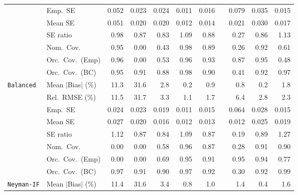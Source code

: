 \begin{landscape}
\begin{longtable}{llrrrrrrrrr}
 & Emp.\ SE & 0.052 & 0.023 & 0.024 & 0.011 & 0.016 &  & 0.079 & 0.035 & 0.015 \\
 & Mean SE & 0.051 & 0.020 & 0.020 & 0.012 & 0.014 &  & 0.021 & 0.030 & 0.017 \\
 & SE ratio & \cellcolor{rankone}0.98 & 0.87 & 0.83 & \cellcolor{ranktwo}1.09 & \cellcolor{rankthree}0.88 &  & 0.27 & 0.86 & 1.13 \\
 & Nom.\ Cov. & \cellcolor{rankone}0.95 & 0.00 & 0.43 & \cellcolor{ranktwo}0.98 & \cellcolor{rankthree}0.89 &  & 0.26 & \cellcolor{ranktwo}0.92 & 0.61 \\
 & Orc.\ Cov.\ (Emp) & \cellcolor{ranktwo}0.96 & 0.00 & 0.53 & \cellcolor{ranktwo}0.96 & \cellcolor{rankthree}0.93 &  & 0.87 & \cellcolor{rankone}0.95 & 0.48 \\
 & Orc.\ Cov.\ (BC) & \cellcolor{rankone}0.95 & 0.91 & 0.88 & \cellcolor{rankthree}0.98 & 0.90 &  & 0.41 & \cellcolor{rankthree}0.92 & \cellcolor{ranktwo}0.97 \\
\addlinespace[2pt]
\quad \texttt{Balanced} & Mean $|$Bias$|$ (\%) & 11.3 & 31.6 & 2.8 & \cellcolor{rankone}0.2 & \cellcolor{rankthree}0.9 &  & \cellcolor{ranktwo}0.8 & \cellcolor{rankone}0.2 & 1.8 \\
 & Rel.\ RMSE (\%) & 11.5 & 31.7 & 3.3 & \cellcolor{rankone}1.1 & \cellcolor{ranktwo}1.7 &  & 6.4 & 2.8 & \cellcolor{rankthree}2.3 \\
 & Emp.\ SE & 0.024 & 0.023 & 0.019 & 0.011 & 0.015 &  & 0.064 & 0.028 & 0.015 \\
 & Mean SE & 0.027 & 0.020 & 0.016 & 0.012 & 0.013 &  & 0.012 & 0.025 & 0.019 \\
 & SE ratio & \cellcolor{rankthree}1.12 & 0.87 & 0.84 & \cellcolor{rankone}1.09 & 0.87 &  & 0.19 & \cellcolor{ranktwo}0.89 & 1.27 \\
 & Nom.\ Cov. & 0.00 & 0.00 & 0.58 & \cellcolor{rankone}0.96 & 0.87 &  & 0.28 & \cellcolor{ranktwo}0.91 & \cellcolor{rankthree}0.90 \\
 & Orc.\ Cov.\ (Emp) & 0.00 & 0.00 & 0.69 & \cellcolor{rankone}0.95 & \cellcolor{rankthree}0.91 &  & \cellcolor{rankone}0.95 & \cellcolor{ranktwo}0.94 & 0.77 \\
 & Orc.\ Cov.\ (BC) & \cellcolor{rankone}0.97 & \cellcolor{rankthree}0.91 & 0.90 & \cellcolor{rankone}0.97 & \cellcolor{ranktwo}0.92 &  & 0.30 & \cellcolor{ranktwo}0.92 & \cellcolor{rankthree}0.99 \\
\addlinespace[2pt]
\quad \texttt{Neyman-IF} & Mean $|$Bias$|$ (\%) & 11.4 & 31.6 & 3.4 & \cellcolor{ranktwo}0.8 & \cellcolor{rankthree}1.0 &  & 1.4 & \cellcolor{rankone}0.4 & 1.6 \\

\end{longtable}
\end{landscape}
